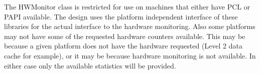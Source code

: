 %



The HWMonitor class is restricted for use on machines that either
have PCL or PAPI available. The design uses the platform independent
interface of these libraries for the actual interface to the hardware
monitoring. Also some platforms may not have some of the requested hardware
counters available. This may be because a given platform does not have 
the hardware requested (Level 2 data cache for example), or it may be because
hardware monitoring is not available. In either case only the available
statistics will be provided.
